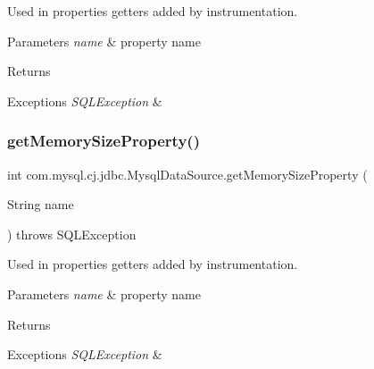 Used in properties getters added by instrumentation.


\begin{DoxyParams}{Parameters}
{\em name} & property name \\
\hline
\end{DoxyParams}
\begin{DoxyReturn}{Returns}

\end{DoxyReturn}

\begin{DoxyExceptions}{Exceptions}
{\em S\+Q\+L\+Exception} & \\
\hline
\end{DoxyExceptions}
\mbox{\label{classcom_1_1mysql_1_1cj_1_1jdbc_1_1_mysql_data_source_a61f6c9894994c146027c18d42b2fffe2}} 
\subsubsection{\texorpdfstring{get\+Memory\+Size\+Property()}{getMemorySizeProperty()}}
{\footnotesize\ttfamily int com.\+mysql.\+cj.\+jdbc.\+Mysql\+Data\+Source.\+get\+Memory\+Size\+Property (\begin{DoxyParamCaption}\item[{String}]{name }\end{DoxyParamCaption}) throws S\+Q\+L\+Exception\hspace{0.3cm}{\ttfamily [protected]}}

Used in properties getters added by instrumentation.


\begin{DoxyParams}{Parameters}
{\em name} & property name \\
\hline
\end{DoxyParams}
\begin{DoxyReturn}{Returns}

\end{DoxyReturn}

\begin{DoxyExceptions}{Exceptions}
{\em S\+Q\+L\+Exception} & \\
\hline
\end{DoxyExceptions}
\mbox{\label{classcom_1_1mysql_1_1cj_1_1jdbc_1_1_mysql_data_source_a45dddaf76537f2f708c6790e348369fa}} 
